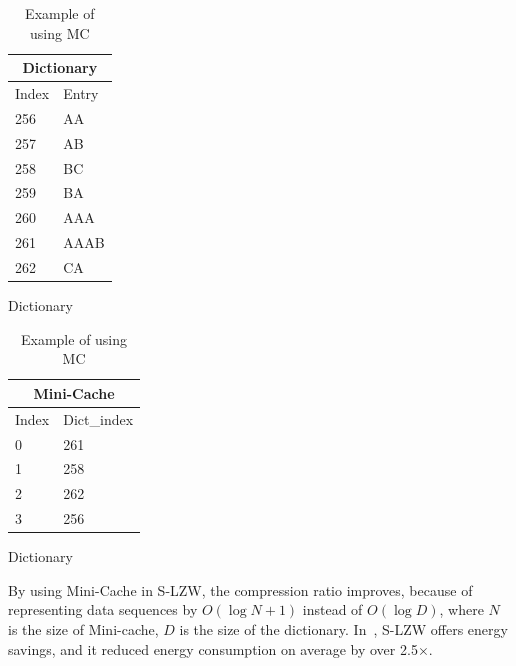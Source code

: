 \begin{table}[]
    \begin{minipage}{.45\textwidth}
        \centering
        \begin{tabular}{|l|l|}
        \hline
        \multicolumn{2}{c}{Dictionary}  \\ \hline
        Index           & Entry         \\ \hline
        256             & AA            \\ 
        257             & AB            \\ 
        258             & BC            \\ 
        259             & BA            \\
        260             & AAA           \\
        261             & AAAB          \\
        262             & CA            \\
        \hline
        \end{tabular}
    \caption{Dictionary}
    \end{minipage}
    \hfill
    \begin{minipage}{.45\textwidth}
        \centering
        \begin{tabular}{|l|l|}
        \hline
        \multicolumn{2}{c}{Mini-Cache}  \\ \hline
        Index        & Dict\_index      \\ \hline
        0            & 261              \\
        1            & 258              \\
        2            & 262              \\
        3            & 256              \\
        \hline
        \end{tabular}
    \caption{Dictionary}
    \end{minipage}
   
    \caption{Example of using MC}
    \label{table:MC}
\end{table}


By using Mini-Cache in S-LZW, the compression ratio improves, because of
representing data sequences by $O(\log N + 1)$ instead of $O(\log D)$,
where $N$ is the size of Mini-cache, $D$ is the size of the dictionary.
In~\cite{sadler2006data}, S-LZW offers energy savings, and it reduced
energy consumption on average by over 2.5$\times$.


